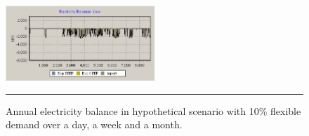 \begin{figure}
	\centering
	\includegraphics[width=0.5\textwidth]{figures/B17-balance.png}
	\rule{0.5\textwidth}{0.5pt} %
	\caption{Annual electricity balance in hypothetical scenario with 10\% flexible demand over a day, a week and a month.}
	\label{fig:B17-balance}
\end{figure}